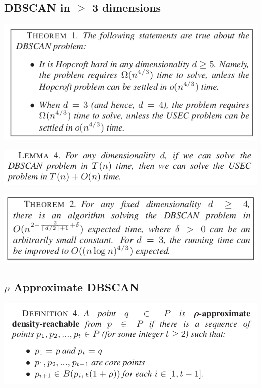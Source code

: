 \documentclass[11pt]{article}
\begin{document}
\subsection{DBSCAN in \(\geq\) 3 dimensions}
\label{sec:org9bbdf0b}
\begin{center}
\includegraphics[width=.9\linewidth]{DBSCAN Revisted/screenshot_2018-12-05_15-46-34.png}
\end{center}


\begin{center}
\includegraphics[width=.9\linewidth]{DBSCAN Revisted/screenshot_2018-12-05_15-47-41.png}
\end{center}


\begin{center}
\includegraphics[width=.9\linewidth]{DBSCAN Revisted/screenshot_2018-12-05_15-51-20.png}
\end{center}

\subsection{\(\rho\) Approximate DBSCAN}
\label{sec:org65b16ae}
\begin{center}
\includegraphics[width=.9\linewidth]{DBSCAN Revisted/screenshot_2018-12-05_16-02-06.png}
\end{center}
\end{document}

